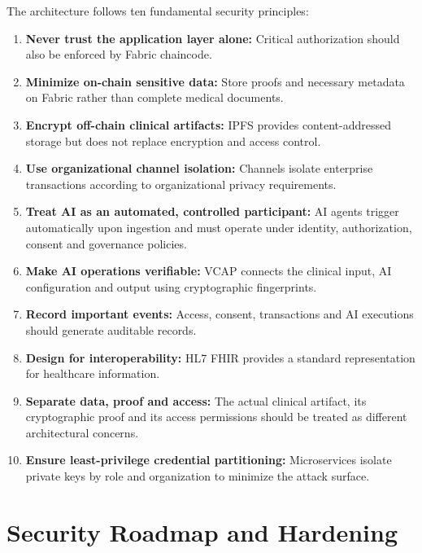 \documentclass[11pt,a4paper]{article}
\begin{document}
The architecture follows ten fundamental security principles:
\begin{enumerate}
    \item \textbf{Never trust the application layer alone:} Critical authorization should also be enforced by Fabric chaincode.
    \item \textbf{Minimize on-chain sensitive data:} Store proofs and necessary metadata on Fabric rather than complete medical documents.
    \item \textbf{Encrypt off-chain clinical artifacts:} IPFS provides content-addressed storage but does not replace encryption and access control.
    \item \textbf{Use organizational channel isolation:} Channels isolate enterprise transactions according to organizational privacy requirements.
    \item \textbf{Treat AI as an automated, controlled participant:} AI agents trigger automatically upon ingestion and must operate under identity, authorization, consent and governance policies.
    \item \textbf{Make AI operations verifiable:} VCAP connects the clinical input, AI configuration and output using cryptographic fingerprints.
    \item \textbf{Record important events:} Access, consent, transactions and AI executions should generate auditable records.
    \item \textbf{Design for interoperability:} HL7 FHIR provides a standard representation for healthcare information.
    \item \textbf{Separate data, proof and access:} The actual clinical artifact, its cryptographic proof and its access permissions should be treated as different architectural concerns.
    \item \textbf{Ensure least-privilege credential partitioning:} Microservices isolate private keys by role and organization to minimize the attack surface.
\end{enumerate}

\newpage
\section{Security Roadmap and Hardening}
\end{document}
